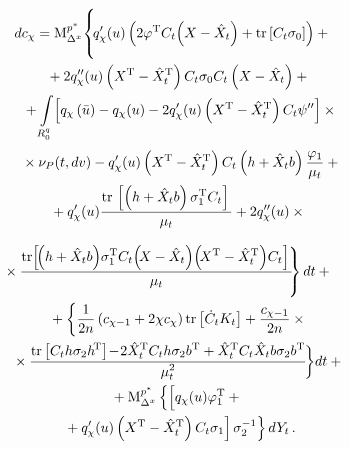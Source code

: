 \begin{multicols}{2}
\noindent
    \begin{multline*}
    \hspace*{-3.42464pt}\!\!dc_\chi =\mm_{\Delta^x}^{p^*} \!\left\{ 
    \vphantom{\fr{\mathrm{tr}\!
 \left[ \!\left(h+ \hat X_t b\right) \!
\sigma_1^{\mathrm{T}} C_t\!\left(\!X-\hat X_t\right)\!
    \left(\!X^{\mathrm{T}}-\hat X_t^{\mathrm{T}}\right)\! C_t\right]}{\mu_t}}\!
    q_\chi^\prime(u) \left(2\varphi^{\mathrm{T}} C_t\!\left(
    X-\hat X_t\right) + \mathrm{tr} \left[ C_t\sigma_0\right]\right) +{}\right.\\
{}+2q_\chi^{\prime\prime} (u) \left(X^{\mathrm{T}} -\hat X_t^{\mathrm{T}}\right) 
C_t\sigma_0 C_t\left(X-\hat X_t\right)+{}\\
\hspace*{1mm}{}+\iii_{R_0^q}\! \left[ q_\chi\left(\bar u\right) -q_\chi (u) - 2 q_\chi' (u) 
\left(X^{\mathrm{T}}-\hat X_t^{\mathrm{T}}\right) C_t\psi''\right] \times{}\\
\hspace*{1.5mm}{}\times \nu_P (t, dv) - 
q_\chi' (u) \left(X^{\mathrm{T}}-\hat X_t^{\mathrm{T}}\right) 
C_t\left(h+\hat X_t b\right) \fr{\varphi_1}{\mu_t} +{}\\
{}+q_\chi^\prime(u) \fr{\mathrm{tr}\, \left[ \left(h+
    \hat X_t b\right) \sigma_1^{\mathrm{T}} C_t\right]}{\mu_t} +
    2q_\chi^{\prime\prime}(u) \times{}
\end{multline*}

\noindent
\begin{multline}
\hspace*{-3pt}\left.\!\!\!\hspace*{-8.33337pt}{}\times \fr{\mathrm{tr}\!
 \left[ \!\left(h+ \hat X_t b\right) \!
\sigma_1^{\mathrm{T}} C_t\!\left(\!X-\hat X_t\right)\!
    \left(\!X^{\mathrm{T}}-\hat X_t^{\mathrm{T}}\right)\! C_t\right]}{\mu_t} \!\!\right\}dt +{}\\
{} + \biggl\{ \fr{1}{2n} \left(c_{\chi-1} + 2\chi
    c_\chi\right) \mathrm{tr} \left[ \dot C_t K_t\right]+
     \fr{c_{\chi-1}}{2n} \times{}\\
     {}\times\fr{\mathrm{tr} \left[ C_t h\sigma_2 h^{\!\mathrm{T}}\right]\! -\! 2
    \hat X_t^{\mathrm{T}} C_t h \sigma_2 b^{\mathrm{T}} 
+
    \hat X_t^{\mathrm{T}} C_t\hat X_t b \sigma_2
    b^{\mathrm{T}}}{\mu_t^2}\!\biggr\} dt+ {}\\
    {}+
    \mm_{\Delta^x}^{p^*}\left\{\left[
    \vphantom{    \left(X^{\mathrm{T}}-\hat X_t^{\mathrm{T}}\right)}
     q_\chi (u)
    \varphi_1^{\mathrm{T}} +{}\right.\right.\\
\left.\left.    {}+ q_\chi^\prime(u) 
    \left(X^{\mathrm{T}}-\hat X_t^{\mathrm{T}}\right) C_t\sigma_1 \right]  
    \sigma_2^{-1}\right\} dY_t\,.
    \label{e3.14-s}
    \end{multline}


\end{multicols}
